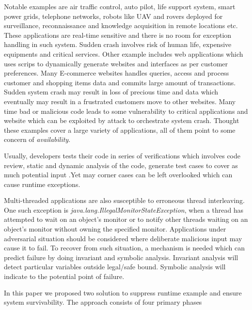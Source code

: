Notable examples are air traffic control, auto pilot, life support system, smart
power grids, telephone networks, robots like UAV and rovers deployed for
surveillance, reconnaissance and knowledge acquisition in remote locations etc.
These applications are real-time sensitive and there is no room for exception
handling in such system.
Sudden crash involves risk of human life, expensive equipments and critical
services.
Other example includes web applications which uses scrips to dynamically
generate websites and interfaces as per customer preferences.
Many E-commerce websites handles queries, access and process customer and
shopping items data and commits large amount of transactions.
Sudden system crash may result in loss of precious time and data which
eventually may result in a frustrated customers move to other websites.
Many time bad or malicious code leads to some vulnerability to critical
applications and website which can be exploited by attack to orchestrate system
crash. Thought these examples cover a large variety of applications, all of them
point to some concern of \emph{availability}.

Usually, developers tests their code in series of verifications which involves
code review, static and dynamic analysis of the code, generate test cases to
cover as much potential input .Yet may corner cases can be left overlooked which
can cause runtime exceptions.

Multi-threaded applications are also susceptible to erroneous thread
interleaving. One such exception is
\emph{java.lang.IllegalMonitorStateException}, when a thread has attempted to
wait on an object's monitor or to notify other threads waiting on an object's
monitor without owning the specified monitor. Applications under adversarial
situation should be considered where deliberate malicious input may cause it to
fail. To recover from such situation, a mechanism is needed which can predict
failure by doing invariant and symbolic analysis. Invariant analysis will detect
particular variables outside legal/safe bound. Symbolic analysis will indicate
to the potential point of failure.


In this paper we proposed two solution to suppress runtime example and ensure
system survivability. The approach consists of four primary phases

